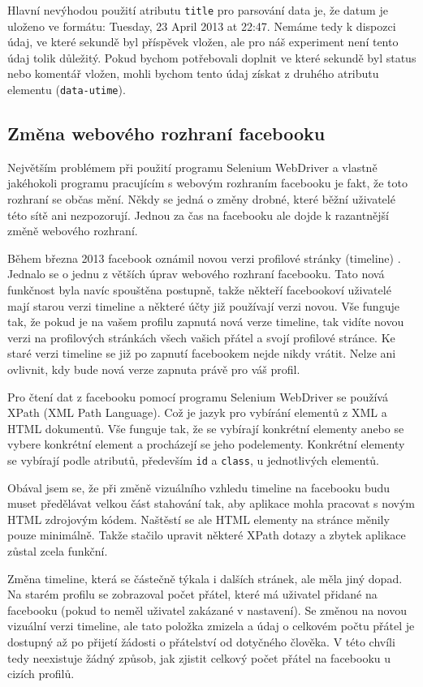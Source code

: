 \documentclass[thesis=M,czech]{FITthesis}[2013/05/10]
\begin{document}
Hlavní nevýhodou použití atributu \verb|title| pro parsování data je, že datum je uloženo ve formátu: Tuesday, 23 April 2013 at 22:47. Nemáme tedy k dispozci údaj, ve které sekundě byl příspěvek vložen, ale pro náš experiment není tento údaj tolik důležitý. Pokud bychom potřebovali doplnit ve které sekundě byl status nebo komentář vložen, mohli bychom tento údaj získat z druhého atributu elementu (\verb|data-utime|). 

\subsection{Změna webového rozhraní facebooku}

Největším problémem při použití programu Selenium WebDriver a vlastně jakéhokoli programu pracujícím s webovým rozhraním facebooku je fakt, že toto rozhraní se občas mění. Někdy se jedná o změny drobné, které běžní uživatelé této sítě ani nezpozorují. Jednou za čas na facebooku ale dojde k razantnější změně webového rozhraní.

Během března 2013 facebook oznámil novou verzi profilové stránky (timeline) \cite{web:fbTimelineImprovements}. Jednalo se o jednu z větších úprav webového rozhraní facebooku. Tato nová funkčnost byla navíc spouštěna postupně, takže někteří facebookoví uživatelé mají starou verzi timeline a některé účty již používají verzi novou. Vše funguje tak, že pokud je na vašem profilu zapnutá nová verze timeline, tak vidíte novou verzi na profilových stránkách všech vašich přátel a svojí profilové stránce. Ke staré verzi timeline se již po zapnutí facebookem nejde nikdy vrátit. Nelze ani ovlivnit, kdy bude nová verze zapnuta právě pro váš profil.

Pro čtení dat z facebooku pomocí programu Selenium WebDriver se používá XPath (XML Path Language). Což je jazyk pro vybírání elementů z XML a HTML dokumentů. Vše funguje tak, že se vybírají konkrétní elementy anebo se vybere konkrétní element a procházejí se jeho podelementy. Konkrétní elementy se vybírají podle atributů, především \verb|id| a \verb|class|, u jednotlivých elementů.

Obával jsem se, že při změně vizuálního vzhledu timeline na facebooku budu muset předělávat velkou část stahování tak, aby aplikace mohla pracovat s novým HTML zdrojovým kódem. Naštěstí se ale HTML elementy na stránce měnily pouze minimálně. Takže stačilo upravit některé XPath dotazy a zbytek aplikace zůstal zcela funkční.

Změna timeline, která se částečně týkala i dalších stránek, ale měla jiný dopad. Na starém profilu se zobrazoval počet přátel, které má uživatel přidané na facebooku (pokud to neměl uživatel zakázané v nastavení). Se změnou na novou vizuální verzi timeline, ale tato položka zmizela a údaj o celkovém počtu přátel je dostupný až po přijetí žádosti o přátelství od dotyčného člověka. V této chvíli tedy neexistuje žádný způsob, jak zjistit celkový počet přátel na facebooku u cizích profilů. 
\end{document}
